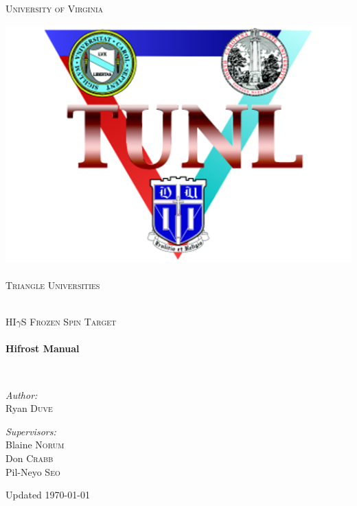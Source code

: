 \begin{titlepage}
\begin{center}
\begin{minipage}{.48\textwidth}
\textsc{\normalsize University of Virginia}\\[1.5cm]
\end{minipage}
\hfill
\noindent\begin{minipage}{.25\textwidth}
\centering
\includegraphics[width=\linewidth]{./img/tunl-logo.png}~\\[.5cm]
\textsc{\normalsize Triangle Universities}\\[1.5cm]
\end{minipage}
\\[80pt]
\textsc{\Large HI$\gamma$S Frozen Spin Target}\\[0.5cm]

\HRule \\[0.4cm]
{ \huge \bfseries Hifrost Manual \\[0.4cm] }

\HRule \\[1.5cm]

\begin{minipage}{0.4\textwidth}
\begin{flushleft} \large
\emph{Author:}\\
Ryan \textsc{Duve}
\end{flushleft}
\end{minipage}
\begin{minipage}{0.4\textwidth}
\begin{flushright} \large
\emph{Supervisors:} \\
Blaine \textsc{Norum} \\
Don \textsc{Crabb} \\
Pil-Neyo \textsc{Seo}
\end{flushright}
\end{minipage}

\vfill

{\large Updated \today}

\end{center}
\end{titlepage}
